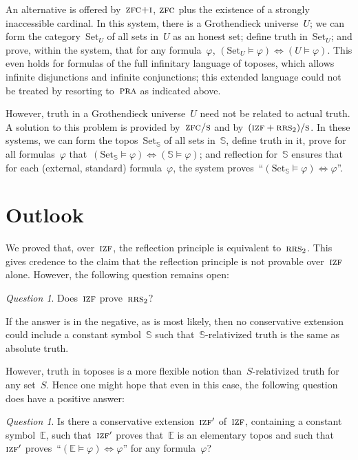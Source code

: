 \documentclass[oneside,reqno]{amsart}
\theoremstyle{definition}
\theoremstyle{plain}
\theoremstyle{remark}
\newtheorem{question}[defn]{Question}
\newcommand{\EE}{\mathbb{E}}
\renewcommand{\SS}{\mathbb{S}}
\newcommand{\Set}{\mathrm{Set}}
\renewcommand{\_}{\mathpunct{.}\,}
\newcommand{\?}{\,{:}\,}
\newcommand{\PRA}{\textsc{pra}}
\newcommand{\IZF}{\textsc{izf}}
\newcommand{\ZFC}{\textsc{zfc}}
\newcommand{\ZFCS}{\textsc{zfc/s}}
\newcommand{\ZFCI}{\textsc{zfc+i}}
\newcommand{\RRS}{\textsc{rrs}}
\newcommand{\ES}{(\IZF+\RRS_2)/\textsc{s}}
\begin{document}
An alternative is offered by~$\ZFCI$, $\ZFC$ plus the existence of a
strongly inaccessible cardinal. In this system, there is a Grothendieck
universe~$U$; we can form the category~$\Set_U$ of all sets in~$U$ as an honest
set; define truth in~$\Set_U$; and prove, within the system, that for any
formula~$\varphi$, $(\Set_U \models \varphi) \Leftrightarrow (U \models
\varphi)$. This even holds for formulas of the full infinitary language of
toposes, which allows infinite disjunctions and infinite conjunctions; this
extended language could not be treated by resorting to~$\PRA$ as indicated above.

However, truth in a Grothendieck universe~$U$ need not be related to actual
truth. A solution to this problem is provided by~$\ZFCS$ and by~$\ES$. In these systems, we can
form the topos~$\Set_\SS$ of all sets in~$\SS$, define truth in it, prove for all formulas~$\varphi$
that~$(\Set_\SS \models \varphi) \Leftrightarrow (\SS \models \varphi)$; and
reflection for~$\SS$ ensures that for each (external, standard)
formula~$\varphi$, the system proves~``$(\Set_\SS \models \varphi)
\Leftrightarrow \varphi$''.


\section{Outlook}

We proved that, over~$\IZF$, the reflection principle is equivalent
to~$\RRS_2$. This gives credence to the claim that the reflection principle is
not provable over~$\IZF$ alone. However, the following question remains open:

\begin{question}Does~$\IZF$ prove~$\RRS_2$?\end{question}

If the answer is in the negative, as is most likely, then no conservative
extension could include a constant symbol~$\SS$ such that~$\SS$-relativized
truth is the same as absolute truth.

However, truth in toposes is a more flexible notion than~$S$-relativized
truth for any set~$S$. Hence one might hope that even in this case, the
following question does have a positive answer:

\begin{question}Is there a conservative extension~$\IZF'$ of~$\IZF$, containing
a constant symbol~$\EE$, such that~$\IZF'$ proves that~$\EE$ is an elementary
topos and such that~$\IZF'$ proves~``$(\EE \models \varphi) \Leftrightarrow
\varphi$'' for any formula~$\varphi$?\end{question}

\printbibliography
\end{document}
